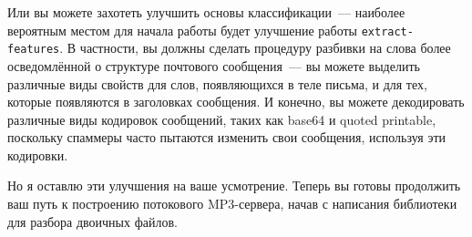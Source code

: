 Или вы можете захотеть улучшить основы классификации~--- наиболее вероятным местом для
начала работы будет улучшение работы \lstinline{extract-features}.  В частности, вы должны
сделать процедуру разбивки на слова более осведомлённой о структуре почтового сообщения~---
вы можете выделить различные виды свойств для слов, появляющихся в теле письма, и для тех,
которые появляются в заголовках сообщения.  И конечно, вы можете декодировать различные
виды кодировок сообщений, таких как base64 и quoted printable, поскольку спаммеры часто
пытаются изменить свои сообщения, используя эти кодировки.

Но я оставлю эти улучшения на ваше усмотрение.  Теперь вы готовы продолжить ваш путь к
построению потокового MP3-сервера, начав с написания библиотеки для разбора двоичных
файлов.

